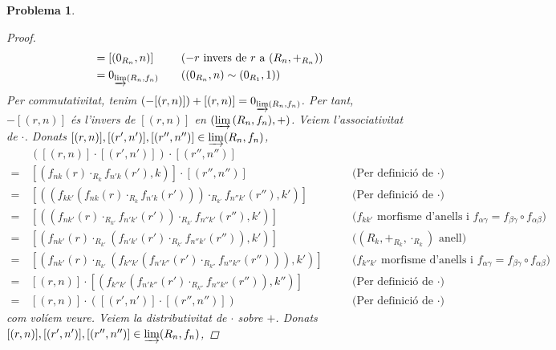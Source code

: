 \documentclass[compress]{article}
\newtheorem{problema}{Problema}
\theoremstyle{definition}
\begin{document}
\begin{problema}
\begin{enumerate}
\begin{proof}
\begin{align*}
                &=[(0_{R_{n}},n)]
                &\quad&\textrm{($-r$ invers de $r$ a $(R_{n},+_{R_{n}})$)}\\
                &=0_{\varinjlim(R_{n},f_{n})}
                &\quad&\textrm{($(0_{R_{n}},n)\sim(0_{R_{1}},1)$)}
            \end{align*}
            Per commutativitat, tenim $(-[(r,n)])+[(r,n)]=0_{\varinjlim(R_{n},f_{n})}$. Per tant, $-[(r,n)]$ és l'invers de $[(r,n)]$ en $(\varinjlim{(R_{n},f_{n})},+)$.\newline
            Veiem l'associativitat de $\cdot$. Donats $[(r,n)],[(r',n')],[(r'',n'')]\in\varinjlim(R_{n},f_{n})$,
            \begin{align*}
                &([(r,n)]\cdot[(r',n')])\cdot[(r'',n'')]\\
                =\,
                &[(f_{nk}(r)\cdot_{R_{k}}f_{n'k}(r'),k)]\cdot[(r'',n'')]
                &\quad&\textrm{(Per definició de $\cdot$)}\\
                =\,
                &[((f_{kk'}(f_{nk}(r)\cdot_{R_{k}}f_{n'k}(r')))\cdot_{R_{k'}}f_{n''k'}(r''),k')]
                &\quad&\textrm{(Per definició de $\cdot$)}\\
                =\,
                &[((f_{nk'}(r)\cdot_{R_{k'}}f_{n'k'}(r'))\cdot_{R_{k'}}f_{n''k'}(r''),k')]
                &\quad&\textrm{($f_{kk'}$ morfisme d'anells i $f_{\alpha\gamma}=f_{\beta\gamma}\circ f_{\alpha\beta}$)}\\
                =\,
                &[(f_{nk'}(r)\cdot_{R_{k'}}(f_{n'k'}(r')\cdot_{R_{k'}}f_{n''k'}(r'')),k')]
                &\quad&\textrm{($(R_{k},+_{R_{k}},\cdot_{R_{k}})$ anell)}\\
                =\,
                &[(f_{nk'}(r)\cdot_{R_{k'}}(f_{k''k'}(f_{n'k''}(r')\cdot_{R_{k''}}f_{n''k''}(r''))),k')]
                &\quad&\textrm{($f_{k''k'}$ morfisme d'anells i $f_{\alpha\gamma}=f_{\beta\gamma}\circ f_{\alpha\beta}$)}\\
                =\,
                &[(r,n)]\cdot[(f_{k''k'}(f_{n'k''}(r')\cdot_{R_{k''}}f_{n''k''}(r'')),k'')]
                &\quad&\textrm{(Per definició de $\cdot$)}\\
                =\,
                &[(r,n)]\cdot([(r',n')]\cdot[(r'',n'')])
                &\quad&\textrm{(Per definició de $\cdot$)}
            \end{align*}
            com volíem veure.\newline
            Veiem la distributivitat de $\cdot$ sobre $+$. Donats $[(r,n)],[(r',n')],[(r'',n'')]\in\varinjlim(R_{n},f_{n})$,

\end{proof}
\end{enumerate}
\end{problema}
\end{document}
